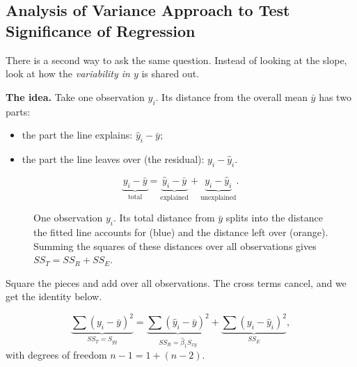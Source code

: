 \subsection{Analysis of Variance Approach to Test Significance of Regression}

There is a second way to ask the same question. Instead of looking at the slope, look at how the \emph{variability in $y$} is shared out.

\textbf{The idea.} Take one observation $y_i$. Its distance from the overall mean $\bar{y}$ has two parts:
\begin{itemize}
  \item the part the line explains: $\hat{y}_i-\bar{y}$;
  \item the part the line leaves over (the residual): $y_i-\hat{y}_i$.
\end{itemize}
\[ \underbrace{y_i-\bar{y}}_{\text{total}}=\underbrace{\hat{y}_i-\bar{y}}_{\text{explained}}+\underbrace{y_i-\hat{y}_i}_{\text{unexplained}}. \]

\begin{figure}[h]
\centering
{}
\caption{One observation $y_i$. Its total distance from $\bar{y}$ splits into the distance the fitted line accounts for (blue) and the distance left over (orange). Summing the squares of these distances over all observations gives $SS_T=SS_R+SS_E$.}
\end{figure}

Square the pieces and add over all observations. The cross terms cancel, and we get the identity below.

\begin{theorem}\label{thm:anova-reg}
\[ \underbrace{\sum(y_i-\bar{y})^2}_{SS_T=S_{yy}}=\underbrace{\sum(\hat{y}_i-\bar{y})^2}_{SS_R=\hat\beta_1S_{xy}}+\underbrace{\sum(y_i-\hat{y}_i)^2}_{SS_E}, \]
with degrees of freedom $n-1=1+(n-2)$.
\end{theorem}

